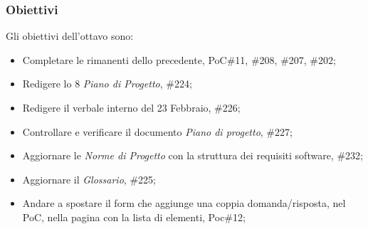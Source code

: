 \subsubsection{Obiettivi}
\label{sec:sprint8_obiettivi}
Gli obiettivi dell'ottavo  sono:
\begin{itemize}
    \item Completare le  rimanenti dello  precedente,  PoC\#11, \#208, \#207, \#202;
    \item Redigere lo  8 \textit{Piano di Progetto},  \#224;
    \item Redigere il verbale interno del 23 Febbraio,  \#226;
    \item Controllare e verificare il documento \textit{Piano di progetto},  \#227;
        \item Aggiornare le \textit{Norme di Progetto} con la struttura dei requisiti software,  \#232;
    \item Aggiornare il \textit{Glossario},  \#225;
    \item Andare a spostare il form che aggiunge una coppia domanda/risposta, nel PoC, nella pagina con la lista di elementi,  Poc\#12;
\end{itemize}